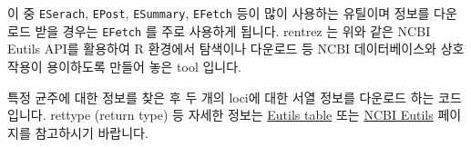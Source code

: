 \documentclass[
]{book}
\newenvironment{Shaded}{\begin{snugshade}}{\end{snugshade}}
\newcommand{\AttributeTok}[1]{\textcolor[rgb]{0.77,0.63,0.00}{#1}}
\newcommand{\FunctionTok}[1]{\textcolor[rgb]{0.00,0.00,0.00}{#1}}
\newcommand{\NormalTok}[1]{#1}
\newcommand{\OtherTok}[1]{\textcolor[rgb]{0.56,0.35,0.01}{#1}}
\newcommand{\SpecialCharTok}[1]{\textcolor[rgb]{0.00,0.00,0.00}{#1}}
\newcommand{\StringTok}[1]{\textcolor[rgb]{0.31,0.60,0.02}{#1}}
\begin{document}
이 중 \texttt{ESerach}, \texttt{EPost}, \texttt{ESummary}, \texttt{EFetch} 등이 많이 사용하는 유틸이며 정보를 다운로드 받을 경우는 \texttt{EFetch} 를 주로 사용하게 됩니다. rentrez 는 위와 같은 NCBI Eutils API를 활용하여 R 환경에서 탐색이나 다운로드 등 NCBI 데이터베이스와 상호작용이 용이하도록 만들어 놓은 tool 입니다.

\begin{Shaded}
\end{Shaded}

특정 균주에 대한 정보를 찾은 후 두 개의 loci에 대한 서열 정보를 다운로드 하는 코드입니다. rettype (return type) 등 자세한 정보는 \href{https://www.ncbi.nlm.nih.gov/books/NBK25499/table/chapter4.T._valid_values_of__retmode_and/}{Eutils table} 또는 \href{https://www.ncbi.nlm.nih.gov/books/NBK25499/}{NCBI Eutils} 페이지를 참고하시기 바랍니다.
\end{document}
